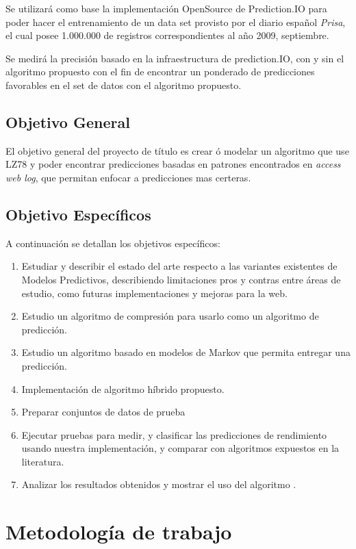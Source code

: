 \documentclass{udparticle}
\begin{document}
Se utilizará como base la implementación OpenSource de Prediction.IO para poder hacer el entrenamiento de un data set provisto por el diario español \emph{Prisa}, el cual posee 1.000.000 de registros correspondientes al año 2009, septiembre.

Se medirá la precisión basado en la infraestructura de prediction.IO, con  y sin el algoritmo propuesto con el fin de encontrar un ponderado de predicciones favorables en el set de datos con el algoritmo propuesto.


\subsection{Objetivo General}
 
El objetivo general del proyecto de título es crear ó modelar un algoritmo que use LZ78 y  poder encontrar predicciones basadas en patrones encontrados en \emph{access web log}, que permitan enfocar a predicciones mas certeras.
 
\subsection{Objetivo  Específicos }
 
A continuación se detallan los objetivos específicos:
 
\begin{enumerate}
  \item Estudiar y describir el estado del arte respecto a las variantes existentes de Modelos Predictivos, describiendo limitaciones pros y contras entre áreas de estudio, como futuras implementaciones y mejoras para la web.
  \item Estudio un algoritmo de compresión para usarlo como un algoritmo de predicción.
  \item Estudio un algoritmo basado en modelos de Markov que permita entregar una predicción.
  \item Implementación de algoritmo híbrido propuesto.
  \item Preparar conjuntos de datos de prueba 
  \item Ejecutar pruebas para medir, y clasificar las predicciones de rendimiento usando nuestra implementación, y comparar con algoritmos expuestos en la literatura.
  \item Analizar los resultados obtenidos y mostrar el uso del algoritmo .
\end{enumerate}


\section{Metodología de trabajo}
\end{document}
